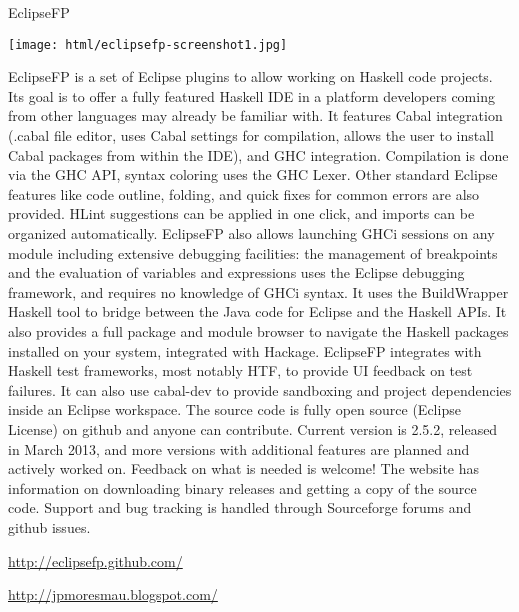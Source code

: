 \begin{hcarentry}[updated]{EclipseFP}
\makeheader

\begin{center}
\texttt{[image: html/eclipsefp-screenshot1.jpg]}
\end{center}

EclipseFP is a set of Eclipse plugins to allow working on Haskell code projects. Its goal is to offer a fully featured Haskell IDE in a platform developers coming from other languages may already be familiar with.
It features Cabal integration (.cabal file editor, uses Cabal settings for compilation, allows the user to install Cabal packages from within the IDE), and GHC integration. Compilation is done via the GHC API, syntax coloring uses the GHC Lexer. Other standard Eclipse features like code outline, folding, and quick fixes for common errors are also provided. HLint suggestions can be applied in one click, and imports can be organized automatically. EclipseFP also allows launching GHCi sessions on any module including extensive debugging facilities: the management of breakpoints and the evaluation of variables and expressions uses the Eclipse debugging framework, and requires no knowledge of GHCi syntax. It uses the BuildWrapper Haskell tool to bridge between the Java code for Eclipse and the Haskell APIs. It also provides a full package and module browser to navigate the Haskell packages installed on your system, integrated with Hackage.
EclipseFP integrates with Haskell test frameworks, most notably HTF, to provide UI feedback on test failures. It can also use cabal-dev to provide sandboxing and project dependencies inside an Eclipse workspace.
The source code is fully open source (Eclipse License) on github and anyone can contribute. Current version is 2.5.2, released in March 2013, and more versions with additional features are planned and actively worked on. Feedback on what is needed is welcome! The website has information on downloading binary releases and getting a copy of the source code. Support and bug tracking is handled through Sourceforge forums and github issues. 

\FurtherReading
\begin{compactitem}
\item \url{http://eclipsefp.github.com/}
\item \url{http://jpmoresmau.blogspot.com/}
\end{compactitem}
\end{hcarentry}
